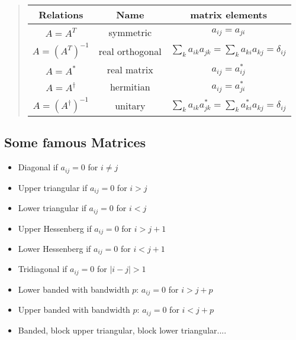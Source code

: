 \documentclass[%
oneside,                 %
final,                   %
10pt]{article}
\begin{document}
\begin{quote}
\begin{tabular}{ccc}
\hline
\multicolumn{1}{c}{ Relations } & \multicolumn{1}{c}{ Name } & \multicolumn{1}{c}{ matrix elements } \\
\hline
$A = A^{T}$                            & symmetric       & $a_{ij} = a_{ji}$                                                       \\
$A = \left (A^{T} \right )^{-1}$       & real orthogonal & $\sum_k a_{ik} a_{jk} = \sum_k a_{ki} a_{kj} = \delta_{ij}$             \\
$A = A^{ * }$                          & real matrix     & $a_{ij} = a_{ij}^{ * }$                                                 \\
$A = A^{\dagger}$                      & hermitian       & $a_{ij} = a_{ji}^{ * }$                                                 \\
$A = \left (A^{\dagger} \right )^{-1}$ & unitary         & $\sum_k a_{ik} a_{jk}^{ * } = \sum_k a_{ki}^{ * } a_{kj} = \delta_{ij}$ \\
\hline
\end{tabular}
\end{quote}

\noindent




\subsection{Some famous Matrices}

\begin{itemize}
  \item Diagonal if $a_{ij}=0$ for $i\ne j$

  \item Upper triangular if $a_{ij}=0$ for $i > j$

  \item Lower triangular if $a_{ij}=0$ for $i < j$

  \item Upper Hessenberg if $a_{ij}=0$ for $i > j+1$

  \item Lower Hessenberg if $a_{ij}=0$ for $i < j+1$

  \item Tridiagonal if $a_{ij}=0$ for $|i -j| > 1$

  \item Lower banded with bandwidth $p$: $a_{ij}=0$ for $i > j+p$

  \item Upper banded with bandwidth $p$: $a_{ij}=0$ for $i < j+p$

  \item Banded, block upper triangular, block lower triangular....
\end{itemize}
\end{document}
